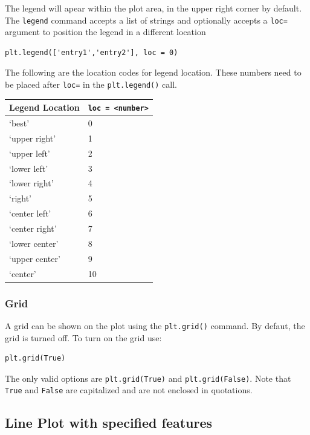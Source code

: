 \documentclass{book}
\begin{document}
The legend will apear within the plot area, in the upper right corner by
default. The \lstinline!legend! command accepts a list of strings and
optionally accepts a \lstinline!loc=! argument to position the legend in
a different location

\begin{lstlisting}
plt.legend(['entry1','entry2'], loc = 0)
\end{lstlisting}

The following are the location codes for legend location. These numbers
need to be placed after \lstinline!loc=! in the \lstinline!plt.legend()!
call.

\begin{longtable}[]{@{}ll@{}}
\toprule
Legend Location & \lstinline!loc = <number>!\tabularnewline
\midrule
\endhead
`best' & 0\tabularnewline
`upper right' & 1\tabularnewline
`upper left' & 2\tabularnewline
`lower left' & 3\tabularnewline
`lower right' & 4\tabularnewline
`right' & 5\tabularnewline
`center left' & 6\tabularnewline
`center right' & 7\tabularnewline
`lower center' & 8\tabularnewline
`upper center' & 9\tabularnewline
`center' & 10\tabularnewline
\bottomrule
\end{longtable}
    




    
        \subsubsection{Grid}\label{grid}

A grid can be shown on the plot using the \lstinline!plt.grid()!
command. By defaut, the grid is turned off. To turn on the grid use:

\begin{lstlisting}
plt.grid(True)
\end{lstlisting}

The only valid options are \lstinline!plt.grid(True)! and
\lstinline!plt.grid(False)!. Note that \lstinline!True! and
\lstinline!False! are capitalized and are not enclosed in quotations.
    




    
        \subsection{Line Plot with specified
features}\label{line-plot-with-specified-features}
    
\end{document}
